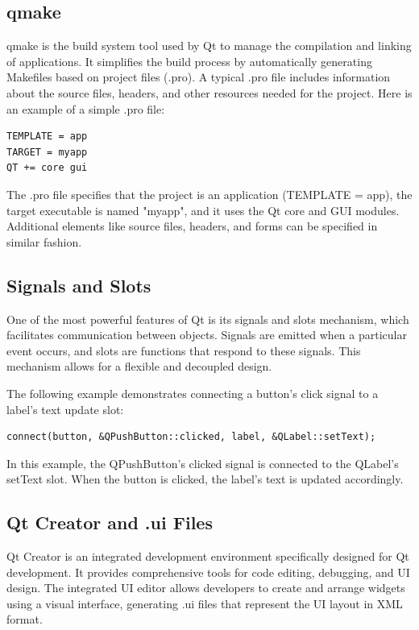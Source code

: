 \subsection{qmake}
qmake is the build system tool used by Qt to manage the compilation and linking of applications.
It simplifies the build process by automatically generating Makefiles based on project files (.pro).
A typical .pro file includes information about the source files, headers,
and other resources needed for the project. Here is an example of a simple .pro file:

\begin{verbatim}
TEMPLATE = app
TARGET = myapp
QT += core gui
\end{verbatim}

The .pro file specifies that the project is an application (TEMPLATE = app),
the target executable is named "myapp", and it uses the Qt core and GUI modules.
Additional elements like source files, headers, and forms can be specified in similar fashion.

\subsection{Signals and Slots}
One of the most powerful features of Qt is its signals and slots mechanism,
which facilitates communication between objects.
Signals are emitted when a particular event occurs,
and slots are functions that respond to these signals.
This mechanism allows for a flexible and decoupled design.

The following example demonstrates connecting a button's click signal to a label's text update slot:

\begin{verbatim}
connect(button, &QPushButton::clicked, label, &QLabel::setText);
\end{verbatim}

In this example, the QPushButton's clicked signal is connected to the QLabel's setText slot.
When the button is clicked, the label's text is updated accordingly.

\subsection{Qt Creator and .ui Files}
Qt Creator is an integrated development environment specifically designed for Qt development.
It provides comprehensive tools for code editing, debugging, and UI design.
The integrated UI editor allows developers to create and arrange widgets using a visual interface,
generating .ui files that represent the UI layout in XML format.
